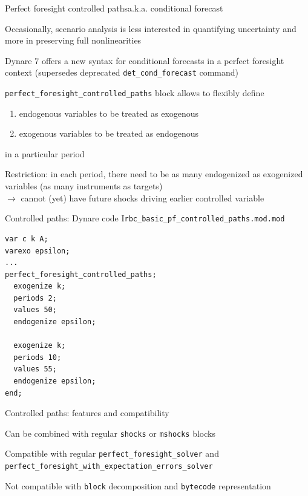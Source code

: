 \documentclass[handout,usepdftitle=false,xcolor=dvipsnames,aspectratio=169]{beamer}
\begin{document}
\begin{frame}[fragile]{Perfect foresight controlled paths}{a.k.a. conditional forecast}
  
\begin{witemize}
  \item Occasionally, scenario analysis is less interested in quantifying uncertainty and more in preserving full nonlinearities
  \item Dynare 7 offers a new syntax for conditional forecasts in a perfect foresight context (supersedes deprecated \texttt{det\_cond\_forecast} command)
  \item \texttt{perfect\_foresight\_controlled\_paths} block allows to flexibly define 
  \begin{enumerate}
    \item endogenous variables to be treated as exogenous 
    \item exogenous variables to be treated as endogenous
  \end{enumerate}
  in a particular period
  \item Restriction: in each period, there need to be as many endogenized as exogenized variables (as many instruments as targets)\\
  $\rightarrow$ cannot (yet) have future shocks driving earlier controlled variable
\end{witemize}

\end{frame}


\begin{frame}[fragile]{Controlled paths: Dynare code I}{\texttt{rbc\_basic\_pf\_controlled\_paths.mod.mod}}
\begin{verbatim}
var c k A;
varexo epsilon;
...
perfect_foresight_controlled_paths;
  exogenize k;
  periods 2;
  values 50;
  endogenize epsilon;

  exogenize k;
  periods 10;
  values 55;
  endogenize epsilon;
end;
\end{verbatim}
\end{frame}

\begin{frame}[fragile]{Controlled paths: features and compatibility}
  \begin{witemize}
  \item Can be combined with regular \texttt{shocks} or \texttt{mshocks} blocks
  \item Compatible with regular \texttt{perfect\_foresight\_solver} and \\
  \texttt{perfect\_foresight\_with\_expectation\_errors\_solver}
  \item Not compatible with \texttt{block} decomposition and \texttt{bytecode} representation
  \end{witemize}
\end{frame}
\end{document}
